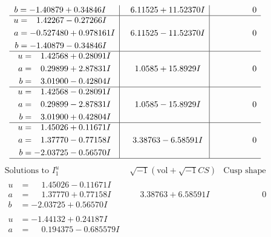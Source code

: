 \documentclass[1p]{elsarticle_modified}
\theoremstyle{definition}
\newcommand{\I}{\sqrt{-1}}
\begin{document}
$$\begin{array}{c|c|c}
\begin{aligned}
b &= -1.40879 + 0.34846 I\end{aligned}
 & \phantom{-}6.11525 + 11.52370 I & \phantom{-0.000000 } 0 \\ \hline\begin{aligned}
u &= \phantom{-}1.42267 - 0.27266 I \\
a &= -0.527480 + 0.978161 I \\
b &= -1.40879 - 0.34846 I\end{aligned}
 & \phantom{-}6.11525 - 11.52370 I & \phantom{-0.000000 } 0 \\ \hline\begin{aligned}
u &= \phantom{-}1.42568 + 0.28091 I \\
a &= \phantom{-}0.29899 + 2.87831 I \\
b &= \phantom{-}3.01900 - 0.42804 I\end{aligned}
 & \phantom{-}1.0585 + 15.8929 I & \phantom{-0.000000 } 0 \\ \hline\begin{aligned}
u &= \phantom{-}1.42568 - 0.28091 I \\
a &= \phantom{-}0.29899 - 2.87831 I \\
b &= \phantom{-}3.01900 + 0.42804 I\end{aligned}
 & \phantom{-}1.0585 - 15.8929 I & \phantom{-0.000000 } 0 \\ \hline\begin{aligned}
u &= \phantom{-}1.45026 + 0.11671 I \\
a &= \phantom{-}1.37770 - 0.77158 I \\
b &= -2.03725 - 0.56570 I\end{aligned}
 & \phantom{-}3.38763 - 6.58591 I & \phantom{-0.000000 } 0\\
 \hline 
 \end{array}$$\newpage$$\begin{array}{c|c|c}  
\text{Solutions to }I^u_{1}& \I (\text{vol} + \sqrt{-1}CS) & \text{Cusp shape}\\
 \hline 
\begin{aligned}
u &= \phantom{-}1.45026 - 0.11671 I \\
a &= \phantom{-}1.37770 + 0.77158 I \\
b &= -2.03725 + 0.56570 I\end{aligned}
 & \phantom{-}3.38763 + 6.58591 I & \phantom{-0.000000 } 0 \\ \hline\begin{aligned}
u &= -1.44132 + 0.24187 I \\
a &= \phantom{-}0.194375 - 0.685579 I \\

\end{aligned}
\end{array}$$
\end{document}
